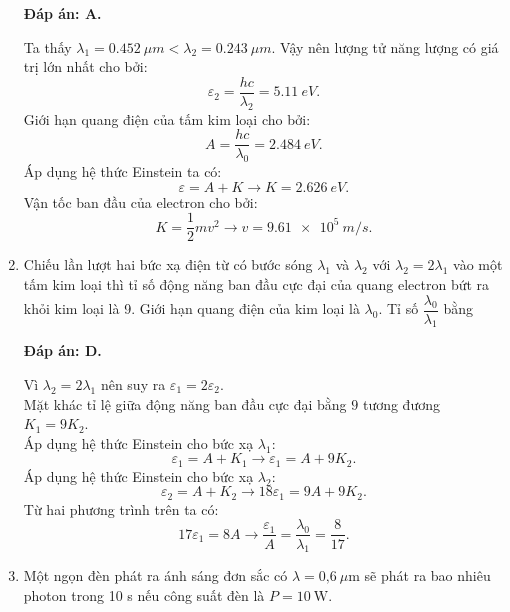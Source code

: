 \begin{enumerate}[label=\bfseries Câu \arabic*:]
	\loigiai
	{		\textbf{Đáp án: A.}
		
Ta thấy $ \lambda_{1} = \SI{0,452}{\mu m} < \lambda_{2} = \SI{0,243}{\mu m}$. Vậy nên lượng tử năng lượng có giá trị lớn nhất cho bởi:
$$
	\varepsilon_{2} = \dfrac{hc}{\lambda_{2}} = \SI{5,11}{eV}.
$$
Giới hạn quang điện của tấm kim loại cho bởi:
$$
	A = \dfrac{hc}{\lambda_{0}} = \SI{2,484}{eV}.
$$
Áp dụng hệ thức Einstein ta có:
$$
	\varepsilon = A + K \rightarrow K = \SI{2,626}{eV}.
$$
Vận tốc ban đầu của electron cho bởi:
$$
	K = \dfrac{1}{2}mv^{2} \rightarrow v = \SI{9,61 e5}{m/s}.
$$		
	}
	
	\item {} 
	
	\cauhoi
	{Chiếu lần lượt hai bức xạ điện từ có bước sóng $\lambda_1$ và $\lambda_2$ với $\lambda_2=2\lambda_1$  vào một tấm kim loại thì tỉ số động năng ban đầu cực đại của quang electron bứt ra khỏi kim loại là 9. Giới hạn quang điện của kim loại là $\lambda_0$. Tỉ số $\dfrac{\lambda_0}{\lambda_1}$ bằng
	}
	
	\loigiai
	{		\textbf{Đáp án: D.}

Vì $ \lambda_{2} = 2 \lambda_{1} $ nên suy ra $ \varepsilon_{1} = 2 \varepsilon_{2} $. \\
Mặt khác tỉ lệ giữa động năng ban đầu cực đại bằng $ 9 $ tương đương $ K_{1} = 9 K_{2}$. \\
Áp dụng hệ thức Einstein cho bức xạ $ \lambda_{1} $:
$$
	\varepsilon_{1} = A + K_{1} \rightarrow \varepsilon_{1} = A + 9 K_{2}.
$$
Áp dụng hệ thức Einstein cho bức xạ $ \lambda_{2} $:
$$
	\varepsilon_{2} = A + K_{2} \rightarrow 18\varepsilon_{1} = 9A + 9 K_{2}.
$$
Từ hai phương trình trên ta có:
$$
17 \varepsilon_{1} = 8A \rightarrow \dfrac{\varepsilon_{1}}{A} = \dfrac{\lambda_{0}}{\lambda_{1}} = \dfrac{8}{17}.
$$		
	}
	
	\item {} 
	
	\cauhoi
	{Một ngọn đèn phát ra ánh sáng đơn sắc có $\lambda=\text{0,6}\ \mu\text{m}$ sẽ phát ra bao nhiêu photon trong 10 s nếu công suất đèn là $P = 10\ \text{W}$.
	}
	

\end{enumerate}
